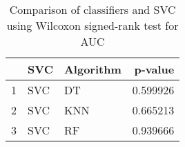 \begin{table}
\footnotesize
\caption{Comparison of classifiers and SVC using Wilcoxon signed-rank test for AUC}
\label{tab:SVC wilcoxon AUC comparison}
\begin{tabular}{lllr}
\hline
 & SVC & Algorithm & p-value \\
\hline
1 & SVC & DT & 0.599926 \\
2 & SVC & KNN & 0.665213 \\
3 & SVC & RF & 0.939666 \\
\hline
\end{tabular}
\end{table}
